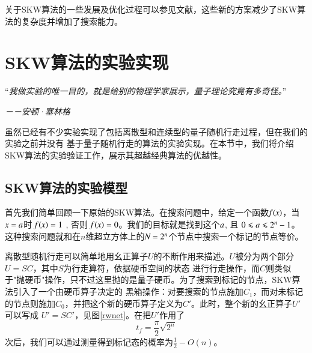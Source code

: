 关于SKW算法的一些发展及优化过程可以参见文献\cite{skw2,skw3,skw4,skw5}，这些新的方案减少了SKW算法的复杂度并增加了搜索能力。

\section{SKW算法的实验实现}

“\emph{我做实验的唯一目的，就是给别的物理学家展示，量子理论究竟有多奇怪。}”

 \hspace{23em} \emph{－－安顿·塞林格}

虽然已经有不少实验实现了包括离散型和连续型的量子随机行走过程\cite{rwexp1,rwexp2,rwexp3,rwexp4}，但在我们的实验之前并没有
基于量子随机行走的算法的实验实现。在本节中，我们将介绍SKW算法的实验验证工作\cite{rw1}，展示其超越经典算法的优越性。

\subsection{SKW算法的实验模型}

首先我们简单回顾一下原始的SKW算法。在搜索问题中，给定一个函数$\emph{f}\left(\emph{x}\right)$，当 $\emph{x}=\emph{a}$时 $\emph{f}\left(\emph{x}\right)=1$  , 否则 $\emph{f}\left(\emph{x}\right)=0$。我们的目标就是找到这个$\emph{a}$, 且 $0\leqslant \emph{a}\leqslant 2^n-1$。这种搜索问题就和在$n$维超立方体上的$\emph{N}=2^n$个节点中搜索一个标记的节点等价。

离散型随机行走可以简单地用幺正算子$U$的不断作用来描述。$U$被分为两个部分$U=SC$，其中$S$为行走算符，依据硬币空间的状态
进行行走操作，而$C$则类似于"抛硬币"操作，只不过这里抛的是量子硬币。为了搜索到标记的节点，SKW算法引入了一个由硬币算子决定的
黑箱操作：对要搜索的节点施加$C_1$，而对未标记的节点则施加$C_0$，并把这个新的硬币算子定义为$C'$。此时，整个新的幺正算子$U'$可以写成
$U'=SC'$，见图\ref{rwnet}。在把$U'$作用了
\begin{equation}
    t_{f}=\frac{\pi}{2}\sqrt{2^n}
\end{equation}
次后，我们可以通过测量得到标记态的概率为$\frac{1}{2}-O(n)$。

